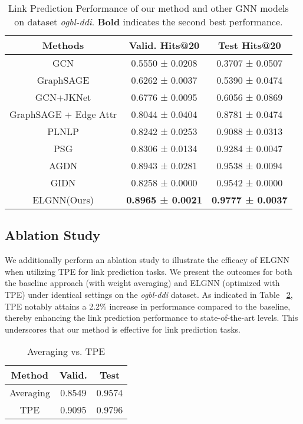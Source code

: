 \documentclass[11pt]{article}
\begin{document}
\begin{table}
    \centering
    \caption{Link Prediction Performance of our method and other GNN models on dataset \textit{ogbl-ddi}. 
    \textbf{Bold} indicates the second best performance. }
    \small
    \setlength\tabcolsep{2pt}
    \begin{tabular}{c|cc}
    \toprule
        Methods & Valid. Hits@20 & Test Hits@20 \\
        \midrule
         GCN & 0.5550 ± 0.0208& 0.3707 ± 0.0507 \\
         GraphSAGE &0.6262 ± 0.0037 & 0.5390 ± 0.0474 \\
         GCN+JKNet & 0.6776 ± 0.0095 & 0.6056 ± 0.0869 \\
         GraphSAGE + Edge Attr & 0.8044 ± 0.0404 & 0.8781 ± 0.0474 \\
         PLNLP & 0.8242 ± 0.0253	& 0.9088 ± 0.0313 \\
         PSG & 0.8306 ± 0.0134 & 0.9284 ± 0.0047 \\
         AGDN & 0.8943 ± 0.0281 & 0.9538 ± 0.0094 \\
         GIDN & 0.8258 ± 0.0000 & 0.9542 ± 0.0000 \\ \midrule
         ELGNN(Ours) & \textbf{0.8965 ± 0.0021} & \textbf{0.9777 ± 0.0037} \\
         \bottomrule
    \end{tabular}
    \label{tab:accuracy improved}
\end{table}

\subsection{Ablation Study}
We additionally perform an ablation study to illustrate the efficacy of ELGNN when utilizing TPE for link prediction tasks. We present the outcomes for both the baseline approach (with weight averaging) and ELGNN (optimized with TPE) under identical settings on the \textit{ogbl-ddi} dataset. 
As indicated in Table ~\ref{tab:ablation study}, TPE notably attains a 2.2\% increase in performance compared to the baseline, thereby enhancing the link prediction performance to state-of-the-art levels. This underscores that our method is effective for link prediction tasks. 
\begin{table}[H]
    \centering
    \caption{Averaging vs. TPE}
    \begin{tabular}{c|cc}
    \toprule
         Method&  Valid. & Test \\
         \midrule
         Averaging& 0.8549 &0.9574 \\
         TPE & 0.9095 & 0.9796 \\
        \bottomrule
    \end{tabular}
    \label{tab:ablation study}
\end{table}
\end{document}
